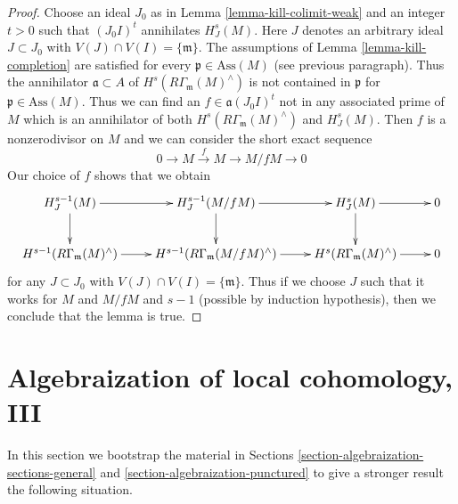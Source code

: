 \begin{proof}
\medskip\noindent
Choose an ideal $J_0$ as in Lemma \ref{lemma-kill-colimit-weak}
and an integer $t > 0$ such that $(J_0I)^t$ annihilates $H^s_J(M)$.
Here $J$ denotes an arbitrary ideal $J \subset J_0$ with
$V(J) \cap V(I) = \{\mathfrak m\}$.
The assumptions of Lemma \ref{lemma-kill-completion}
are satisfied for every $\mathfrak p \in \text{Ass}(M)$
(see previous paragraph). Thus the annihilator $\mathfrak a \subset A$ of
$H^s(R\Gamma_\mathfrak m(M)^\wedge)$
is not contained in $\mathfrak p$ for $\mathfrak p \in \text{Ass}(M)$.
Thus we can find an $f \in \mathfrak a(J_0I)^t$
not in any associated prime of $M$ which is an annihilator
of both $H^s(R\Gamma_\mathfrak m(M)^\wedge)$ and $H^s_J(M)$.
Then $f$ is a nonzerodivisor on $M$ and we can consider the
short exact sequence
$$
0 \to M \xrightarrow{f} M \to M/fM \to 0
$$
Our choice of $f$ shows that we obtain
$$
\xymatrix{
H^{s - 1}_J(M) \ar[d] \ar[r] &
H^{s - 1}_J(M/fM) \ar[d] \ar[r] &
H^s_J(M) \ar[d] \ar[r] & 0 \\
H^{s - 1}(R\Gamma_\mathfrak m(M)^\wedge) \ar[r] &
H^{s - 1}(R\Gamma_\mathfrak m(M/fM)^\wedge) \ar[r] &
H^s(R\Gamma_\mathfrak m(M)^\wedge) \ar[r] & 0
}
$$
for any $J \subset J_0$ with $V(J) \cap V(I) = \{\mathfrak m\}$.
Thus if we choose $J$ such that it works for
$M$ and $M/fM$ and $s - 1$ (possible by induction hypothesis),
then we conclude that the lemma is true.
\end{proof}








\section{Algebraization of local cohomology, III}
\label{section-bootstrap}

\noindent
In this section we bootstrap the material in
Sections \ref{section-algebraization-sections-general} and
\ref{section-algebraization-punctured}
to give a stronger result the following situation.

